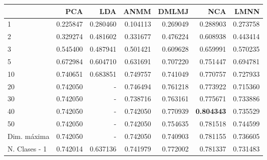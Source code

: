 \begin{tabular}{lrrrrrr}
\toprule
{} &       PCA &       LDA &      ANMM &     DMLMJ &       NCA &      LMNN \\
\midrule
1             &  0.225847 &  0.280460 &  0.104113 &  0.269049 &  0.288903 &  0.273758 \\
2             &  0.329274 &  0.481602 &  0.331677 &  0.476224 &  0.608938 &  0.443414 \\
3             &  0.545400 &  0.487941 &  0.501421 &  0.609628 &  0.659991 &  0.570235 \\
5             &  0.672984 &  0.604710 &  0.631691 &  0.707220 &  0.751447 &  0.694781 \\
10            &  0.740651 &  0.683851 &  0.749757 &  0.741049 &  0.770757 &  0.727933 \\
20            &  0.742050 &  -        &  0.746494 &  0.761218 &  0.773922 &  0.715360 \\
30            &  0.742050 &  -        &  0.738716 &  0.763161 &  0.775671 &  0.733886 \\
40            &  0.742050 &  -        &  0.742050 &  0.770939 &  \textbf{0.804343} &  0.735529 \\
50            &  0.742050 &  -        &  0.742050 &  0.754635 &  0.781518 &  0.744599 \\
Dim. máxima   &  0.742050 &  -        &  0.742050 &  0.740903 &  0.781155 &  0.736605 \\
N. Clases - 1 &  0.742014 &  0.637136 &  0.741979 &  0.772002 &  0.781337 &  0.731483 \\
\bottomrule
\end{tabular}

